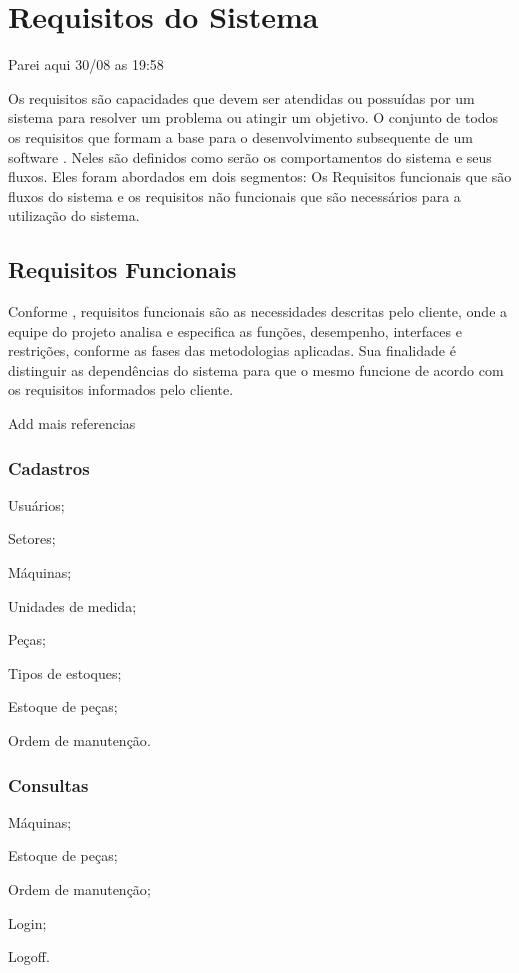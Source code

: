 \chapter{Requisitos do Sistema}

{\color{red} Parei aqui 30/08  as 19:58}


Os requisitos são capacidades que devem ser atendidas ou possuídas por um sistema para resolver um problema ou atingir um objetivo. O conjunto de todos os requisitos que formam a base para o desenvolvimento subsequente de um software \cite{vazquez2016}. Neles são definidos como serão os comportamentos do sistema e seus fluxos. Eles foram  abordados em dois segmentos: Os Requisitos funcionais que são fluxos do sistema e os requisitos não funcionais que são necessários para a utilização do sistema.

\section{Requisitos Funcionais}

{ Conforme \cite{essi2005}, requisitos funcionais são as necessidades descritas pelo cliente, onde a equipe do projeto analisa e
especifica as funções, desempenho, interfaces e restrições, conforme as fases das metodologias aplicadas. Sua finalidade é distinguir as dependências do sistema para que o mesmo funcione de acordo com os requisitos informados pelo cliente. }

{\color{red} Add mais referencias}

\subsection{Cadastros}


\begin{subalineas}
	\item {Usuários};
	\item {Setores};
	\item {Máquinas};
	\item {Unidades de medida};
	\item {Peças};
	\item {Tipos de estoques};
	\item {Estoque de peças};
	\item {Ordem de manutenção}.
\end{subalineas}

\subsection{Consultas}
\begin{subalineas}
	\item {Máquinas};
	\item {Estoque de peças};
	\item {Ordem de manutenção};
	\item {Login};
	\item {Logoff}.
\end{subalineas}

